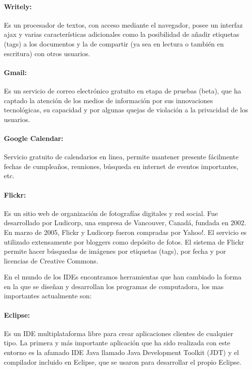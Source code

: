 \paragraph{Writely: \cite{writely}} Es un procesador de textos, con acceso mediante el navegador, posee un interfaz ajax y varias características adicionales como la posibilidad de añadir etiquetas (tags) a los documentos y la de compartir (ya sea en lectura o también en escritura) con otros usuarios.

\paragraph{Gmail: \cite{gmail}} Es un servicio de correo electrónico gratuito en etapa de pruebas (beta), que ha captado la atención de los medios de información por sus innovaciones tecnológicas, su capacidad y por algunas quejas de violación a la privacidad de los usuarios.

\paragraph{Google Calendar: \cite{google_calendar}} Servicio gratuito de calendarios en linea, permite mantener presente fácilmente fechas de cumpleaños, reuniones, búsqueda en internet de eventos importantes, etc.

\paragraph{Flickr: \cite{flickr}} Es un sitio web de organización de fotografías digitales y red social. Fue desarrollado por Ludicorp, una empresa de Vancouver, Canadá, fundada en 2002. En marzo de 2005, Flickr y Ludicorp fueron compradas por Yahoo!. El servicio es utilizado extensamente por bloggers como depósito de fotos. El sistema de Flickr permite hacer búsquedas de imágenes por etiquetas (tags), por fecha y por licencias de Creative Commons.


En el mundo de los IDEs encontramos herramientas que han cambiado la forma en la que se diseñan y desarrollan los programas de computadora, los mas importantes actualmente son:


\paragraph{Eclipse: \cite{eclipse}} Es un IDE multiplataforma libre para crear aplicaciones clientes de cualquier tipo. La primera y más importante aplicación que ha sido realizada con este entorno es la afamado IDE Java llamado Java Development Toolkit (JDT) y el compilador incluido en Eclipse, que se usaron para desarrollar el propio Eclipse.

